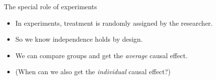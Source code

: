 \documentclass[xcolor={dvipsnames},handout]{beamer}
\begin{document}
% 
% 
% 
% 
% 
% 


\begin{frame}{The special role of experiments}

\begin{itemize}
\item In experiments, treatment is randomly assigned by the researcher. 
\item So we know independence holds by design.  
\item We can compare groups and get the \textit{average} causal effect. 
\item (When can we also get the \textit{individual} causal effect?) 
\end{itemize}

\end{frame}


\end{document}
